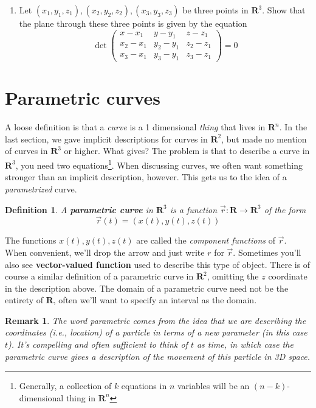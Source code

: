 \documentclass[12pt]{article}
\numberwithin{equation}{subsection}
\numberwithin{figure}{subsection}
\newtheorem{defn}[subsection]{Definition}
\theoremstyle{note}
\newtheorem{remark}[subsection]{Remark}
\begin{document}
{\begin{enumerate}[label=\arabic*.]
	\item Let $(x_1,y_1,z_1), (x_2, y_2, z_2), (x_3, y_3, z_3)$ be three points in $\mathbf{R}^3$. Show that the plane through these three points is given by the equation \[ \det \begin{pmatrix} x-x_1 & y-y_1 & z-z_1 \\ x_2-x_1 & y_2-y_1 & z_2-z_1 \\ x_3-x_1 & y_3-y_1 & z_3-z_1\end{pmatrix} = 0 \]
\end{enumerate}



\section{Parametric curves}
\label{sec-param}

A loose definition is that a \textit{curve} is a 1 dimensional \textit{thing} that lives in $\mathbf{R}^n$. In the last section, we gave implicit descriptions for curves in $\mathbf{R}^2$, but made no mention of curves in $\mathbf{R}^3$ or higher. What gives? The problem is that to describe a curve in $\mathbf{R}^3$, you need two equations\footnote{Generally, a collection of $k$ equations in $n$ variables will be an $(n-k)$-dimensional thing in $\mathbf{R}^n$}. When discussing curves, we often want something stronger than an implicit description, however. This gets us to the idea of a \textit{parametrized} curve. 

\begin{defn} A \textbf{parametric curve} in $\mathbf{R}^3$ is a function $\vec{r}\colon \mathbf{R}\to \mathbf{R}^3$ of the form \begin{equation} \vec{r}(t)=(x(t),y(t),z(t)) \end{equation}  \end{defn} 
The functions $x(t),y(t),z(t)$ are called the \textit{component functions} of $\vec{r}$. When convenient, we'll drop the arrow and just write $r$ for $\vec{r}$. Sometimes you'll also see \textbf{vector-valued function} used to describe this type of object. There is of course a similar definition of a parametric curve in $\mathbf{R}^2$, omitting the $z$ coordinate in the description above. The domain of a parametric curve need not be the entirety of $\mathbf{R}$, often we'll want to specify an interval as the domain. 

\begin{remark}The word \textit{parametric} comes from the idea that we are describing the coordinates (i.e., location) of a particle in terms of a new \textit{parameter} (in this case $t$). It's compelling and often sufficient to think of $t$ as time, in which case the parametric curve gives a description of the movement of this particle in 3D space. \end{remark}

}
\end{document}
